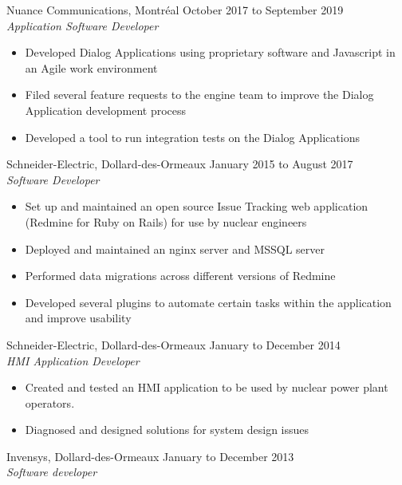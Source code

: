 \documentclass{res}
\begin{document}
\begin{resume}
{      %
	Nuance Communications, Montréal
	\hfill October 2017 to September 2019 \\
	{\sl Application Software Developer}
	\vspace{0.05in}

	\begin{itemize} \itemsep -2pt
		\item Developed Dialog Applications using proprietary software and Javascript in an Agile work environment
		\item Filed several feature requests to the engine team to improve the Dialog Application development process
		\item Developed a tool to run integration tests on the Dialog Applications
	\end{itemize}

	Schneider-Electric, Dollard-des-Ormeaux
	\hfill January 2015 to August 2017 \\
	{\sl Software Developer}
	\vspace{0.05in}

	\begin{itemize} \itemsep -2pt
		\item Set up and maintained an open source Issue Tracking web application (Redmine for Ruby on Rails) for use by nuclear engineers
		\item Deployed and maintained an nginx server and MSSQL server
		\item Performed data migrations across different versions of Redmine
		\item Developed several plugins to automate certain tasks within the application and improve usability
	\end{itemize}

	Schneider-Electric, Dollard-des-Ormeaux
	\hfill January to December 2014 \\
	{\sl HMI Application Developer}
	\vspace{0.05in}

	\begin{itemize} \itemsep -2pt
		\item Created and tested an HMI application to be used by nuclear power plant operators.
		\item Diagnosed and designed solutions for system design issues
	\end{itemize}

	Invensys, Dollard-des-Ormeaux
	\hfill January to December 2013 \\
	{\sl Software developer}
	\vspace{0.05in}

}
\end{resume}
\end{document}
